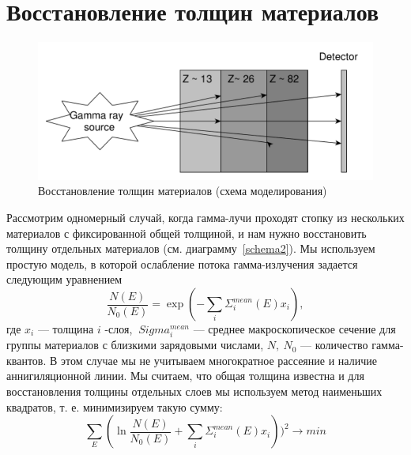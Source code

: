\documentclass[a4paper]{panl}
\begin{document}
\section*{Восстановление толщин материалов}
\begin{figure} 
    \includegraphics[width=\linewidth]{figures/yed_schema_2.pdf}
    \vspace{-3mm}
    \caption{Восстановление толщин материалов (схема моделирования)}
    \vspace{-5mm}
\end{figure}
Рассмотрим одномерный случай, когда гамма-лучи проходят стопку из нескольких материалов с фиксированной общей толщиной, и нам нужно восстановить толщину отдельных материалов (см. диаграмму~\ref{schema2}). Мы используем простую модель, в которой ослабление потока гамма-излучения задается следующим уравнением
\begin{equation}
\label{eq:gamma}
\frac{N(E)}{N_0(E)} = \exp(-\sum_i \Sigma^{mean}_i(E)x_i),
\end{equation}
где $ x_i $ --- толщина $ i $ -слоя, $ \ Sigma ^ {mean} _i $ --- среднее макроскопическое сечение для группы материалов с близкими зарядовыми числами, $ N, ~ N_0 $ --- количество гамма-квантов. В этом случае мы не учитываем многократное рассеяние и наличие аннигиляционной линии. Мы считаем, что общая толщина известна и для восстановления толщины отдельных слоев мы используем метод наименьших квадратов, т. е. минимизируем такую сумму:
\begin{equation}
\sum_E(\ln \frac{N(E)}{N_0(E)} + \sum_i \Sigma^{mean}_i(E)x_i))^2 \to min
\end{equation}
\end{document}
